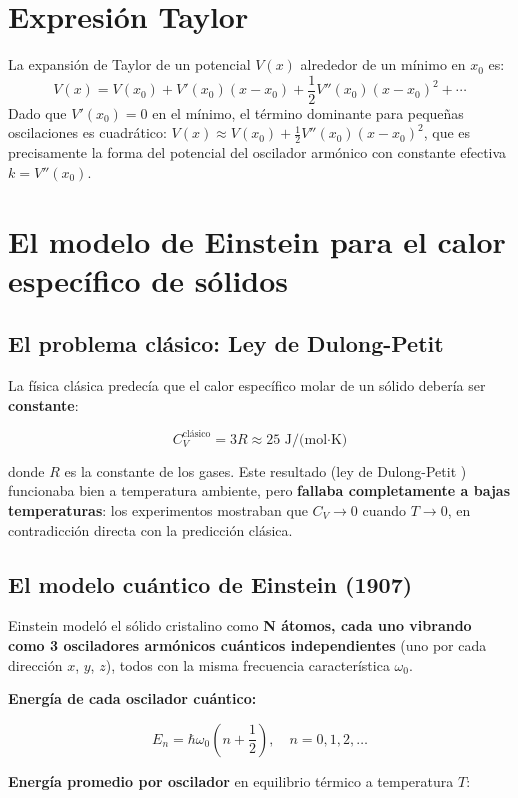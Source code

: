\documentclass[11pt,a4paper,spanish]{book}
\begin{document}
\section{Expresión Taylor} \label{sec:taylor}
La expansión de Taylor de un potencial $V(x)$ alrededor de un mínimo en $x_0$ es:
\[
V(x) = V(x_0) + V'(x_0)(x - x_0) + \frac{1}{2}V''(x_0)(x - x_0)^2 + \cdots
\]
Dado que $V'(x_0) = 0$ en el mínimo, el término dominante para pequeñas oscilaciones es cuadrático: $V(x) \approx V(x_0) + \frac{1}{2}V''(x_0)(x - x_0)^2$, que es precisamente la forma del potencial del oscilador armónico con constante efectiva $k = V''(x_0)$.

\section{El modelo de Einstein para el calor específico de sólidos} \label{sec:einstein}

\subsection*{El problema clásico: Ley de Dulong-Petit}

La física clásica predecía que el calor específico molar de un sólido debería ser \textbf{constante}:

\[
C_V^{\text{clásico}} = 3R \approx 25 \text{ J/(mol·K)}
\]

donde $R$ es la constante de los gases. Este resultado (ley de Dulong-Petit \citep{dulong1819}) funcionaba bien a temperatura ambiente, pero \textbf{fallaba completamente a bajas temperaturas}: los experimentos mostraban que $C_V \to 0$ cuando $T \to 0$, en contradicción directa con la predicción clásica.

\subsection*{El modelo cuántico de Einstein (1907)}

Einstein \citep{einstein1907} modeló el sólido cristalino como \textbf{N átomos, cada uno vibrando como 3 osciladores armónicos cuánticos independientes} (uno por cada dirección $x$, $y$, $z$), todos con la misma frecuencia característica $\omega_0$.

\textbf{Energía de cada oscilador cuántico:}

\[
E_n = \hbar\omega_0\left(n + \frac{1}{2}\right), \quad n = 0, 1, 2, \ldots
\]

\textbf{Energía promedio por oscilador} en equilibrio térmico a temperatura $T$:
\end{document}
